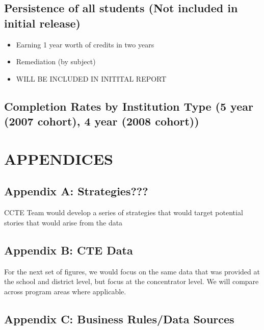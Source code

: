 \documentclass[11pt,]{article}
\providecommand{\tightlist}{%
  \setlength{\itemsep}{0pt}\setlength{\parskip}{0pt}}
\begin{document}
\newpage

\subsection{Persistence of all students (Not included in initial
release)}\label{persistence-of-all-students-not-included-in-initial-release}

\begin{itemize}
\tightlist
\item
  Earning 1 year worth of credits in two years
\item
  Remediation (by subject)
\item
  WILL BE INCLUDED IN INITITAL REPORT
\end{itemize}

\subsection{Completion Rates by Institution Type (5 year (2007 cohort),
4 year (2008
cohort))}\label{completion-rates-by-institution-type-5-year-2007-cohort-4-year-2008-cohort}

\newpage

\section{APPENDICES}\label{appendices}

\subsection{Appendix A: Strategies???}\label{appendix-a-strategies}

CCTE Team would develop a series of strategies that would target
potential stories that would arise from the data

\subsection{Appendix B: CTE Data}\label{appendix-b-cte-data}

For the next set of figures, we would focus on the same data that was
provided at the school and district level, but focus at the concentrator
level. We will compare across program areas where applicable.

\subsection{Appendix C: Business Rules/Data
Sources}\label{appendix-c-business-rulesdata-sources}
\end{document}
